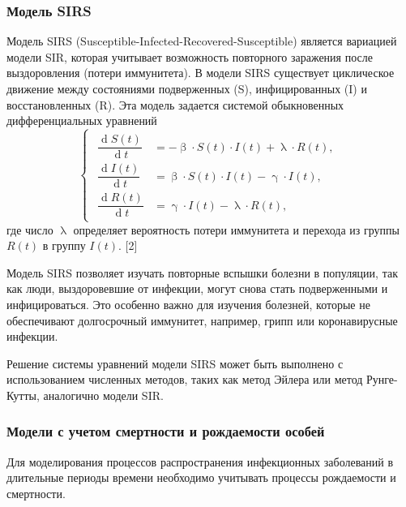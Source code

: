 \documentclass[a4paper, 12pt]{extarticle}
\numberwithin{equation}{section}
\renewcommand{\beta}{\upbeta}
\renewcommand{\gamma}{\upgamma}
\renewcommand{\lambda}{\uplambda}
\renewcommand{\d}{\operatorname{d}}
\begin{document}
	\subsubsection{Модель SIRS}
	Модель SIRS (Susceptible-Infected-Recovered-Susceptible) является вариацией модели SIR, которая учитывает возможность повторного заражения после выздоровления (потери иммунитета). В модели SIRS существует циклическое движение между состояниями подверженных (S), инфицированных (I) и восстановленных (R). Эта модель задается системой обыкновенных дифференциальных уравнений
	\begin{equation}
		\left\{ 
		\begin{gathered} 
			\begin{aligned}
				\dfrac {\d S(t)}{\d t} &= -\beta \cdot S(t) \cdot I(t) + \lambda \cdot R(t),\\
				\dfrac{\d I(t)}{\d t} &= \beta \cdot S(t)\cdot I(t) - \gamma\cdot I(t),\\
				\dfrac{\d R(t)}{\d t} &= \gamma\cdot I(t) - \lambda \cdot R(t),
			\end{aligned}
		\end{gathered} 
		\right.
	\end{equation}
	где число $\lambda$ определяет вероятность потери иммунитета и перехода из группы $R(t)$ в группу $I(t)$. [2]
	
	Модель SIRS позволяет изучать повторные вспышки болезни в популяции, так как люди, выздоровевшие от инфекции, могут снова стать подверженными и инфицироваться. Это особенно важно для изучения болезней, которые не обеспечивают долгосрочный иммунитет, например, грипп или коронавирусные инфекции.
	
	Решение системы уравнений модели SIRS может быть выполнено с использованием численных методов, таких как метод Эйлера или метод Рунге-Кутты, аналогично модели SIR.
	
	\subsubsection{Модели с учетом смертности и рождаемости особей}
	Для моделирования процессов распространения инфекционных заболеваний в длительные периоды времени необходимо учитывать процессы рождаемости и смертности.
	
\end{document}
